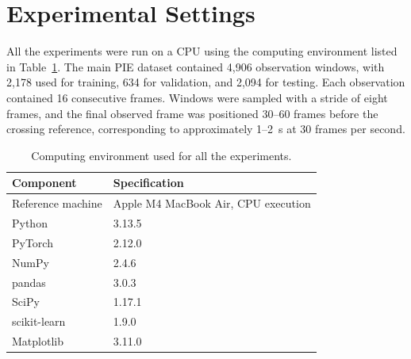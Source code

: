 \documentclass[mti,article,submit,moreauthors]{Definitions/mdpi}
\begin{document}
\section{Experimental Settings}
\label{sec:experimental-settings}

All the experiments were run on a CPU using the computing environment listed in Table~\ref{tab:hardware}. The main PIE dataset contained 4,906 observation windows, with 2,178 used for training, 634 for validation, and 2,094 for testing. Each observation contained 16 consecutive frames. Windows were sampled with a stride of eight frames, and the final observed frame was positioned 30--60 frames before the crossing reference, corresponding to approximately 1--2~s at 30 frames per second.

\begin{table}[htbp]
\centering
\caption{Computing environment used for all the experiments.}
\label{tab:hardware}
\begin{tabular}{ll}
\toprule
\textbf{Component} & \textbf{Specification} \\
\midrule
Reference machine & Apple M4 MacBook Air, CPU execution \\
Python & 3.13.5 \\
PyTorch & 2.12.0 \\
NumPy & 2.4.6 \\
pandas & 3.0.3 \\
SciPy & 1.17.1 \\
scikit-learn & 1.9.0 \\
Matplotlib & 3.11.0 \\
\bottomrule
\end{tabular}
\end{table}

\end{document}
